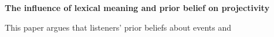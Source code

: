 \documentclass[12pt]{article}
\newcommand{\6}{\mbox{$[\hspace*{-.6mm}[$}}
\newcommand{\9}{\mbox{$]\hspace*{-.6mm}]$}}
\begin{document}
 
 
\begin{center}
{\large \bf The influence of lexical meaning and prior belief on projectivity}
\end{center}

This paper argues that listeners' prior beliefs about events and 




\newpage

\nocite{wagner10}



\end{document}
